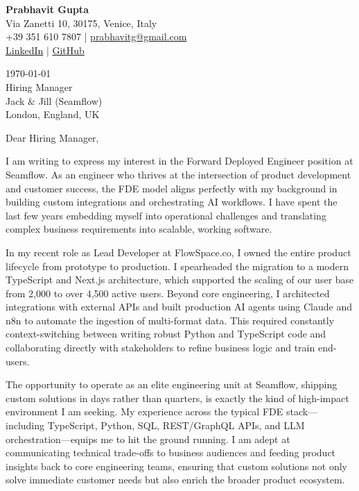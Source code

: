 \documentclass[11pt,a4paper]{article}
\begin{document}
\begin{flushleft}
\textbf{Prabhavit Gupta}\\
Via Zanetti 10, 30175, Venice, Italy\\
+39 351 610 7807 | \href{mailto:prabhavitg@gmail.com}{prabhavitg@gmail.com}\\
\href{https://www.linkedin.com/in/prabhavit/}{LinkedIn} | \href{https://github.com/prab-gupta}{GitHub}
\end{flushleft}

\vspace{2em}

\begin{flushleft}
\today\\
\vspace{1em}
Hiring Manager\\
Jack \& Jill (Seamflow)\\
London, England, UK
\end{flushleft}

\vspace{2em}

Dear Hiring Manager,

I am writing to express my interest in the Forward Deployed Engineer position at Seamflow. As an engineer who thrives at the intersection of product development and customer success, the FDE model aligns perfectly with my background in building custom integrations and orchestrating AI workflows. I have spent the last few years embedding myself into operational challenges and translating complex business requirements into scalable, working software.

In my recent role as Lead Developer at FlowSpace.co, I owned the entire product lifecycle from prototype to production. I spearheaded the migration to a modern TypeScript and Next.js architecture, which supported the scaling of our user base from 2,000 to over 4,500 active users. Beyond core engineering, I architected integrations with external APIs and built production AI agents using Claude and n8n to automate the ingestion of multi-format data. This required constantly context-switching between writing robust Python and TypeScript code and collaborating directly with stakeholders to refine business logic and train end-users. 

The opportunity to operate as an elite engineering unit at Seamflow, shipping custom solutions in days rather than quarters, is exactly the kind of high-impact environment I am seeking. My experience across the typical FDE stack---including TypeScript, Python, SQL, REST/GraphQL APIs, and LLM orchestration---equips me to hit the ground running. I am adept at communicating technical trade-offs to business audiences and feeding product insights back to core engineering teams, ensuring that custom solutions not only solve immediate customer needs but also enrich the broader product ecosystem.
\end{document}
